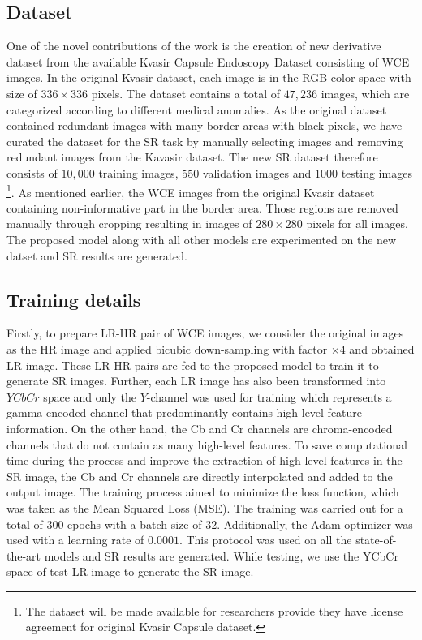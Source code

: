 \documentclass[conference]{IEEEtran}
\begin{document}
\subsection{Dataset}
One of the novel contributions of the work is the creation of new derivative dataset from the available Kvasir Capsule Endoscopy Dataset \cite{data} consisting of WCE images.  
In the original Kvasir dataset, each image is in the RGB color space with size of $336\times336$ pixels. The dataset contains a total of $47,236$ images, which are categorized according to different medical anomalies. As the original dataset contained redundant images with many border areas with black pixels, we have curated the dataset for the SR task by manually selecting images and removing redundant images from the Kavasir dataset.  
The new SR dataset therefore consists of $10,000$ training images, $550$ validation images and $1000$ testing images \footnote{The dataset will be made available for researchers provide they have license agreement for original Kvasir Capsule dataset.}. As mentioned earlier, the WCE images from the original Kvasir dataset containing non-informative part in the border area. Those regions are removed manually through cropping resulting in images of $280\times280$ pixels for all images. The proposed model along with all other models are experimented on the new datset and SR results are generated.


\subsection{Training details}
Firstly, to prepare LR-HR pair of WCE images, we consider the original images as the HR image and applied bicubic down-sampling with factor $\times 4$ and obtained LR image. These LR-HR pairs are fed to the proposed model to train it to generate SR images. Further, each LR image has also been transformed into $YCbCr$ space and only the $Y$-channel was used for training which represents a gamma-encoded channel that predominantly contains high-level feature information. On the other hand, the Cb and Cr channels are chroma-encoded channels that do not contain as many high-level features. To save computational time during the process and improve the extraction of high-level features in the SR image, the Cb and Cr channels are directly interpolated and added to the output image. The training process aimed to minimize the loss function, which was taken as the Mean Squared Loss (MSE). The training was carried out for a total of $300$ epochs with a batch size of $32$. Additionally, the Adam optimizer was used with a learning rate of $0.0001$. This protocol was used on all the state-of-the-art models and SR results are generated. While testing, we use the YCbCr space of test LR image to generate the SR image.
\end{document}
